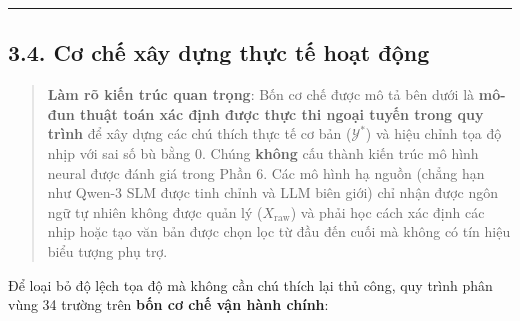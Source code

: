\documentclass[
  11pt,
  a4paper,
]{article}
\begin{document}
\begin{center}\rule{0.5\linewidth}{0.5pt}\end{center}

\subsection{3.4. Cơ chế xây dựng thực tế hoạt
động}\label{cux1a1-chux1ebf-xuxe2y-dux1ef1ng-thux1ef1c-tux1ebf-houx1ea1t-ux111ux1ed9ng}

\begin{quote}
\textbf{Làm rõ kiến \hspace{0pt}\hspace{0pt}trúc quan trọng}: Bốn cơ chế
được mô tả bên dưới là \textbf{mô-đun thuật toán xác định được thực thi
ngoại tuyến trong quy trình} để xây dựng các chú thích thực tế cơ bản
(\(\mathcal{Y}^*\)) và hiệu chỉnh tọa độ nhịp với sai số bù bằng 0.
Chúng \textbf{không} cấu thành kiến \hspace{0pt}\hspace{0pt}trúc mô hình
neural được đánh giá trong Phần 6. Các mô hình hạ nguồn (chẳng hạn như
Qwen-3 SLM được tinh chỉnh và LLM biên giới) chỉ nhận được ngôn ngữ tự
nhiên không được quản lý (\(X_{\text{raw}}\)) và phải học cách xác định
các nhịp hoặc tạo văn bản được chọn lọc từ đầu đến cuối mà không có tín
hiệu biểu tượng phụ trợ.
\end{quote}

Để loại bỏ độ lệch tọa độ mà không cần chú thích lại thủ công, quy trình
phân vùng 34 trường trên \textbf{bốn cơ chế vận hành chính}:
\end{document}
